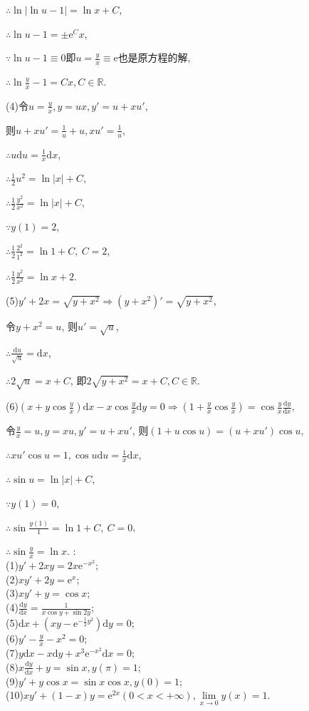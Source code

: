 \documentclass[12pt,UTF8]{ctexart}
\newcommand{\md}[1]{\mathrm d#1}
\newcommand{\me}[0]{\mathrm e}
\begin{document}
\begin{enumerate}
$\therefore\ln|\ln u-1|=\ln x+C$,

$\therefore\ln u-1=\pm\me^Cx$,

$\because\ln u-1\equiv0$即$u=\frac yx\equiv\me$也是原方程的解,

$\therefore\ln\frac yx-1=Cx,C\in\mathbb R$.

(4)令$u=\frac yx,y=ux,y'=u+xu'$,

则$u+xu'=\frac1u+u,xu'=\frac1u$,

$\therefore u\md u=\frac1x\md x$,

$\therefore\frac12u^2=\ln|x|+C$,

$\therefore\frac12\frac{y^2}{x^2}=\ln|x|+C$,

$\because y(1)=2$,

$\therefore\frac12\frac{2^2}{1^2}=\ln1+C,\ C=2$,

$\therefore\frac12\frac{y^2}{x^2}=\ln x+2$.

(5)$y'+2x=\sqrt{y+x^2}\Rightarrow(y+x^2)'=\sqrt{y+x^2}$,

令$y+x^2=u$, 则$u'=\sqrt u$,

$\therefore\frac{\md u}{\sqrt u}=\md x$,

$\therefore2\sqrt u=x+C$, 即$2\sqrt{y+x^2}=x+C,C\in\mathbb R$.

(6)$(x+y\cos\frac yx)\md x-x\cos\frac yx\md y=0\Rightarrow(1+\frac yx\cos\frac yx)=\cos\frac yx\frac{\md y}{\md x}$,

令$\frac yx=u,y=xu,y'=u+xu'$, 则$(1+u\cos u)=(u+xu')\cos u$,

$\therefore xu'\cos u=1,\cos u\md u=\frac1x\md x$,

$\therefore\sin u=\ln|x|+C$,

$\because y(1)=0$,

$\therefore\sin\frac{y(1)}{1}=\ln1+C,\ C=0$,

$\therefore\sin\frac yx=\ln x$.
:\\
(1)$y'+2xy=2x\me^{-x^2}$;\\
(2)$xy'+2y=\me^x$;\\
(3)$xy'+y=\cos x$;\\
(4)$\frac{\md y}{\md x}=\frac1{x\cos y+\sin2y}$;\\
(5)$\md x+(xy-\me^{-\frac12y^2})\md y=0$;\\
(6)$y'-\frac yx-x^2=0$;\\
(7)$y\md x-x\md y+x^3\me^{-x^2}\md x=0$;\\
(8)$x\frac{\md y}{\md x}+y=\sin x,y(\pi)=1$;\\
(9)$y'+y\cos x=\sin x\cos x,y(0)=1$;\\
(10)$xy'+(1-x)y=\me^{2x}(0<x<+\infty),\lim\limits_{x\rightarrow0}y(x)=1$.


\end{enumerate}
\end{document}

